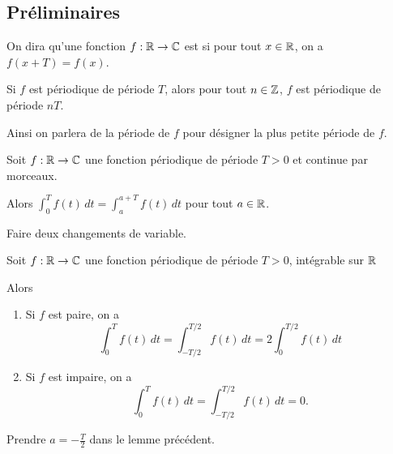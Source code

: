 \documentclass[a4paper,12pt]{article}
\begin{document}
\subsection{Préliminaires}

\begin{definition}
    On dira qu'une fonction $f : \mathbb{R} \to \mathbb{C}$ est  si pour tout $x \in \mathbb{R}$, on a $f(x + T) = f(x)$.
\end{definition}

\begin{remarque}
    Si $f$ est périodique de période $T$, alors pour tout $n \in \mathbb{Z}$, $f$ est périodique de période $nT$.

    Ainsi on parlera de la période de $f$ pour désigner la plus petite période de $f$.
\end{remarque}

\begin{lemme}{}{}
    Soit $f : \mathbb{R} \to \mathbb{C}$ une fonction périodique de période $T > 0$ et continue par morceaux.

    Alors $\int_{0}^{T} f(t) \, dt = \int_{a}^{a + T} f(t) \, dt$ pour tout $a \in \mathbb{R}$.
\end{lemme}

\begin{demonstration}
    Faire deux changements de variable.
\end{demonstration}

\begin{corollaire}{}{}
    Soit $f : \mathbb{R} \to \mathbb{C}$ une fonction périodique de période $T > 0$, intégrable sur $\mathbb{R}$

    Alors
    \begin{enumerate}
        \item Si $f$ est paire, on a
        $$
        \int_0^T f(t) \, dt = \int_{-T/2}^{T/2} f(t) \, dt = 2 \int_0^{T/2} f(t) \, dt
        $$
        
        \item Si $f$ est impaire, on a
        $$
        \int_0^T f(t) \, dt = \int_{-T/2}^{T/2} f(t) \, dt = 0.
        $$
    \end{enumerate}
\end{corollaire}

\begin{demonstration}
    Prendre $a = -\frac{T}{2}$ dans le lemme précédent.
\end{demonstration}
\end{document}
